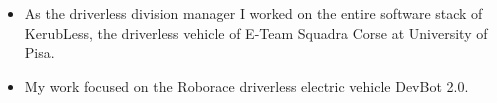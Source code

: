 







\begin{itemize}
\item As the driverless division manager I worked on the entire software stack of KerubLess, the driverless vehicle of E-Team Squadra Corse at University of Pisa.
\end{itemize}
\smallskip
\smallskip
{}
\begin{itemize}
\item My work focused on the Roborace driverless electric vehicle DevBot 2.0.
\end{itemize}